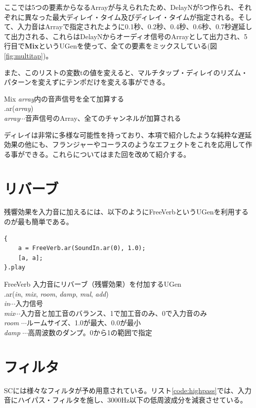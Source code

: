 \documentclass{jsarticle}
\begin{document}
ここでは5つの要素からなるArrayが与えられたため、DelayNが5つ作られ、それぞれに異なった最大ディレイ・タイム及びディレイ・タイムが指定される。そして、入力音はArrayで指定されたように0.1秒、0.2秒、0.4秒、0.6秒、0.7秒遅延して出力される、これらはDelayNからオーディオ信号のArrayとして出力され、5行目で{\bf Mix}というUGenを使って、全ての要素をミックスしている(図\ref{fig:multitap})。

また、このリストの変数tの値を変えると、マルチタップ・ディレイのリズム・パターンを変えずにテンポだけを変える事ができる。

\begin{itembox}[l]{Mix}
{\footnotesize 
{\it array}内の音声信号を全て加算する\\
.ar({\it array})\\
{\it array}$\cdots$音声信号のArray、全てのチャンネルが加算される\\
}
\end{itembox}

ディレイは非常に多様な可能性を持っており、本項で紹介したような純粋な遅延効果の他にも、フランジャーやコーラスのようなエフェクトをこれを応用して作る事ができる。これらについてはまた回を改めて紹介する。

\section{リバーブ}
残響効果を入力音に加えるには、以下のようにFreeVerbというUGenを利用するのが最も簡単である。

\begin{lstlisting}[caption=リバーブ, label=code:reverb]
{
	a = FreeVerb.ar(SoundIn.ar(0), 1.0);
	[a, a];
}.play
\end{lstlisting}

\begin{itembox}[l]{FreeVerb}
{\footnotesize 
入力音にリバーブ（残響効果）を付加するUGen\\
.ar({\it in}, {\it mix}, {\it room}, {\it damp}, {\it mul}, {\it add})\\
{\it in}$\cdots$入力信号\\
{\it mix}$\cdots$入力音と加工音のバランス、1で加工音のみ、0で入力音のみ\\
{\it room} $\cdots$ルームサイズ、1.0が最大、0.0が最小\\
{\it damp} $\cdots$高周波数のダンプ。0から1の範囲で指定\\
}
\end{itembox}

\section{フィルタ}
SCには様々なフィルタが予め用意されている。リスト\ref{code:highpass}では、入力音にハイパス・フィルタを施し、3000Hz以下の低周波成分を減衰させている。
\end{document}
